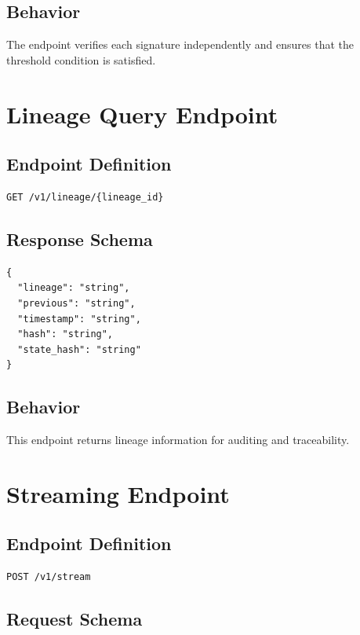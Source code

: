 \subsection{Behavior}

The endpoint verifies each signature independently and ensures that the threshold condition is satisfied.

\section{Lineage Query Endpoint}

\subsection{Endpoint Definition}

\begin{verbatim}
GET /v1/lineage/{lineage_id}
\end{verbatim}

\subsection{Response Schema}

\begin{verbatim}
{
  "lineage": "string",
  "previous": "string",
  "timestamp": "string",
  "hash": "string",
  "state_hash": "string"
}
\end{verbatim}

\subsection{Behavior}

This endpoint returns lineage information for auditing and traceability.

\section{Streaming Endpoint}

\subsection{Endpoint Definition}

\begin{verbatim}
POST /v1/stream
\end{verbatim}

\subsection{Request Schema}

